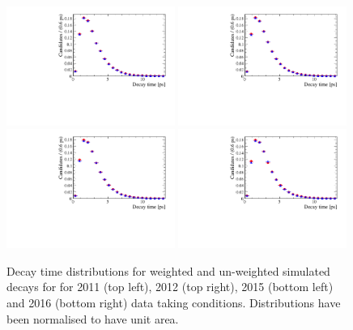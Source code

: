 \begin{figure}[htbp]
  \centering
    \includegraphics[width=0.49\textwidth]{./Figs/LifetimeMeasurement/2011_DT_Bs2MuMu.pdf}
    \includegraphics[width=0.49\textwidth]{./Figs/LifetimeMeasurement/2012_DT_Bs2MuMu.pdf}
    \includegraphics[width=0.49\textwidth]{./Figs/LifetimeMeasurement/2015_DT_Bs2MuMu.pdf}
    \includegraphics[width=0.49\textwidth]{./Figs/LifetimeMeasurement/2016_DT_Bs2MuMu.pdf}
  \caption{Decay time distributions for weighted and un-weighted \bsmumu simulated decays for for 2011 (top left), 2012 (top right), 2015 (bottom left) and 2016 (bottom right) data taking conditions. Distributions have been normalised to have unit area.}
  \label{fig:BsmmVsBdToKpinTracks}
\end{figure}

